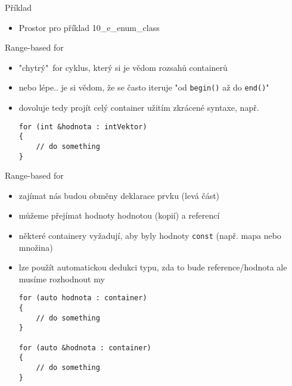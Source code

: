\documentclass{beamer}
\begin{document}
\begin{xframe}{Příklad}
	\begin{itemize}
		\item Prostor pro příklad 10\_e\_enum\_class
	\end{itemize}
\end{xframe}

\begin{xframe}{Range-based for}
	\begin{itemize}
		\item "chytrý"~for cyklus, který si je vědom rozsahů containerů
		\item nebo lépe.. je si vědom, že se často iteruje "od \texttt{begin()} až do \texttt{end()}"
		\item dovoluje tedy projít celý container užitím zkrácené syntaxe, např.
\begin{lstlisting}[basicstyle=\fontsize{8}{9}\selectfont\ttfamily]
for (int &hodnota : intVektor)
{
    // do something
}
\end{lstlisting}
	\end{itemize}
\end{xframe}

\begin{xframe}{Range-based for}
	\begin{itemize}
		\item zajímat nás budou obměny deklarace prvku (levá část)
		\item můžeme přejímat hodnoty hodnotou (kopií) a referencí
		\item některé containery vyžadují, aby byly hodnoty \texttt{const} (např. mapa nebo množina)
		\item lze použít automatickou dedukci typu, zda to bude reference/hodnota ale musíme rozhodnout my
\begin{lstlisting}[basicstyle=\fontsize{8}{9}\selectfont\ttfamily]
for (auto hodnota : container)
{
    // do something
}

for (auto &hodnota : container)
{
    // do something
}
\end{lstlisting}
	\end{itemize}
\end{xframe}
\end{document}
